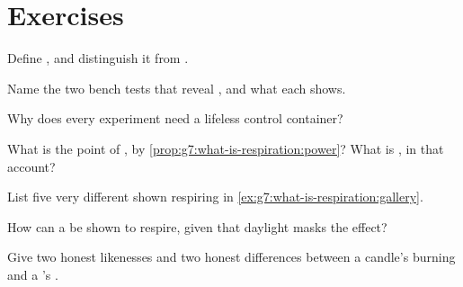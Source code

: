 \section{Exercises}

\begin{exercise}[$\star$]\label{exo:g7:what-is-respiration:1}
Define , and distinguish it from .
\end{exercise}

\begin{exercise}[$\star$]\label{exo:g7:what-is-respiration:2}
Name the two bench tests that reveal , and what
each shows.
\end{exercise}

\begin{exercise}[$\star$]\label{exo:g7:what-is-respiration:3}
Why does every  experiment need a lifeless
control container?
\end{exercise}

\begin{exercise}[$\star$]\label{exo:g7:what-is-respiration:4}
What is the point of , by
\cref{prop:g7:what-is-respiration:power}? What is , in that account?
\end{exercise}

\begin{exercise}[$\star$]\label{exo:g7:what-is-respiration:5}
List five very different  shown respiring in
\cref{ex:g7:what-is-respiration:gallery}.
\end{exercise}

\begin{exercise}[$\star$]\label{exo:g7:what-is-respiration:6}
How can a  be shown to respire, given that daylight
masks the effect?
\end{exercise}

\begin{exercise}[$\star\star$]\label{exo:g7:what-is-respiration:7}
Give two honest likenesses and two honest differences
between a candle's burning and a 's .
\end{exercise}

